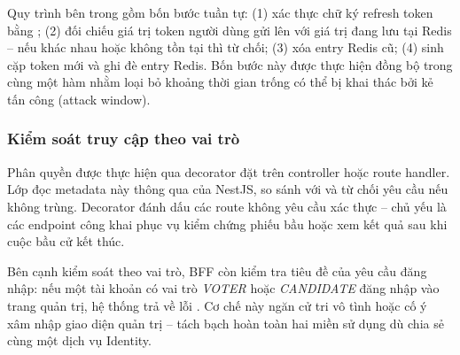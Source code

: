 Quy trình bên trong gồm bốn bước tuần tự: (1) xác thực chữ ký refresh token bằng ; (2) đối chiếu giá trị token người dùng gửi lên với giá trị đang lưu tại Redis -- nếu khác nhau hoặc không tồn tại thì từ chối; (3) xóa entry Redis cũ; (4) sinh cặp token mới và ghi đè entry Redis. Bốn bước này được thực hiện đồng bộ trong cùng một hàm nhằm loại bỏ khoảng thời gian trống có thể bị khai thác bởi kẻ tấn công (attack window).

\subsubsection{Kiểm soát truy cập theo vai trò}

Phân quyền được thực hiện qua decorator  đặt trên controller hoặc route handler. Lớp  đọc metadata này thông qua  của NestJS, so sánh với  và từ chối yêu cầu nếu không trùng. Decorator  đánh dấu các route không yêu cầu xác thực -- chủ yếu là các endpoint công khai phục vụ kiểm chứng phiếu bầu hoặc xem kết quả sau khi cuộc bầu cử kết thúc.

Bên cạnh kiểm soát theo vai trò, BFF còn kiểm tra tiêu đề  của yêu cầu đăng nhập: nếu một tài khoản có vai trò \textit{VOTER} hoặc \textit{CANDIDATE} đăng nhập vào trang quản trị, hệ thống trả về lỗi . Cơ chế này ngăn cử tri vô tình hoặc cố ý xâm nhập giao diện quản trị -- tách bạch hoàn toàn hai miền sử dụng dù chia sẻ cùng một dịch vụ Identity.
